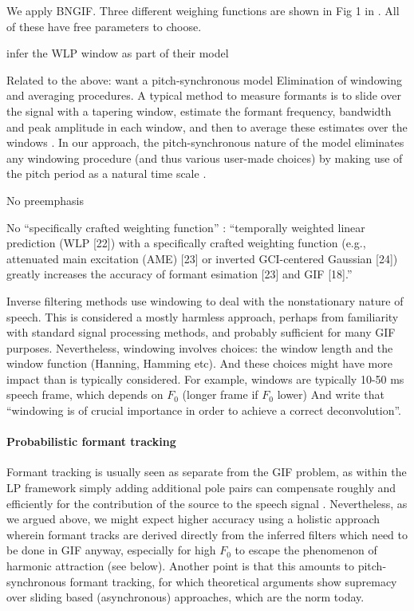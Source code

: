 \begin{chaptersections}{%
We apply BNGIF.
}
Three different weighing functions are shown in Fig 1 in \citep{Gowda2020}. All of these have free parameters to choose.

\citep{Rao2018} infer the WLP window as part of their model

Related to the above: want a pitch-synchronous model
Elimination of windowing and averaging procedures. A typical method to measure formants is to slide over the signal with a tapering window, estimate the formant frequency, bandwidth
and peak amplitude in each window, and then to average these estimates over the windows \citep{Rabiner2007}.
In our approach, the pitch-synchronous nature of the model eliminates any windowing procedure
(and thus various user-made choices) by making use of the pitch period as a natural time scale \citep{Chen2019}.

No preemphasis

No ``specifically crafted weighting function'' : ``temporally weighted linear prediction (WLP [22]) with a specifically crafted weighting function (e.g., attenuated main excitation (AME) [23] or inverted GCI-centered Gaussian [24]) greatly increases the accuracy of formant esimation [23] and GIF [18].'' \citep{Airaksinen2017}

Inverse filtering methods use windowing to deal with the nonstationary nature of speech.
This is considered a mostly harmless approach, perhaps from familiarity with standard signal processing methods, and probably sufficient for many GIF purposes.
Nevertheless, windowing involves choices: the window length and the window function (Hanning, Hamming etc).
And these choices might have more impact than is typically considered.
For example, windows are typically 10-50 ms speech frame, which depends on $F_0$ (longer frame if $F_0$ lower) \citep{Airaksinen2014}
And \cite[p.~xxx]{Drugman2011} write that ``windowing is of crucial importance in order to achieve a correct deconvolution''.

\paragraph{Probabilistic formant tracking}

Formant tracking is usually seen as separate from the GIF problem, as within the LP framework simply adding additional pole pairs can compensate roughly and efficiently for the contribution of the source to the speech signal \citep{Atal1971,Rabiner1993,Schroeder1999}.
Nevertheless, as we argued above, we might expect higher accuracy using a holistic approach wherein formant tracks are derived directly from the inferred filters which need to be done in GIF anyway, especially for high $F_0$ to escape the phenomenon of harmonic attraction (see below).
Another point is that this amounts to pitch-synchronous formant tracking, for which theoretical arguments \citep{Chen2019} show supremacy over sliding based (asynchronous) approaches, which are the norm today.


\end{chaptersections}
